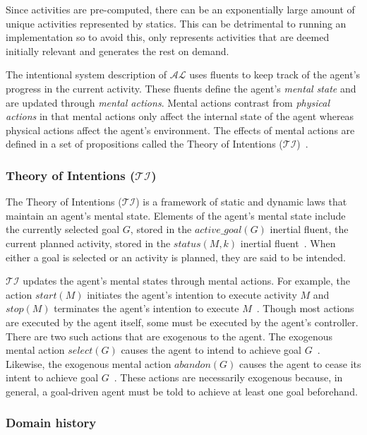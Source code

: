 Since activities are pre-computed, there can be an exponentially large amount of unique activities represented by statics.
This can be detrimental to running an implementation so to avoid this, \citet{blount_architecture_2013} only represents activities that are deemed initially relevant and generates the rest on demand.

The intentional system description of $\mathcal{AL}$ uses fluents to keep track of the agent's progress in the current activity.
These fluents define the agent's \textit{mental state} and are updated through \textit{mental actions}.
Mental actions contrast from \textit{physical actions} in that mental actions only affect the internal state of the agent whereas physical actions affect the agent's environment.
The effects of mental actions are defined in a set of propositions called the Theory of Intentions ($\mathcal{TI}$)~\citep{blount_towards_2014}.

\subsubsection{Theory of Intentions ($\mathcal{TI}$)}
\label{subsubsec:theory_of_intentions}

The Theory of Intentions ($\mathcal{TI}$) is a framework of static and dynamic laws that maintain an agent's mental state.
Elements of the agent's mental state include the currently selected goal $G$, stored in the $active\_goal\left(G\right)$ inertial fluent, the current planned activity, stored in the $status(M, k)$ inertial fluent~\citep{blount_towards_2014}.
When either a goal is selected or an activity is planned, they are said to be intended.

$\mathcal{TI}$ updates the agent's mental states through mental actions.
For example, the action $start(M)$ initiates the agent's intention to execute activity $M$ and $stop(M)$ terminates the agent's intention to execute $M$~\citep{blount_towards_2014}.
Though most actions are executed by the agent itself, some must be executed by the agent's controller.
There are two such actions that are exogenous to the agent.
The exogenous mental action $select(G)$ causes the agent to intend to achieve goal $G$~\citep{blount_towards_2014}.
Likewise, the exogenous mental action $abandon(G)$ causes the agent to cease its intent to achieve goal $G$~\citep{blount_towards_2014}.
These actions are necessarily exogenous because, in general, a goal-driven agent must be told to achieve at least one goal beforehand.

\subsubsection{Domain history}
\label{subsubsec:domain_history}

